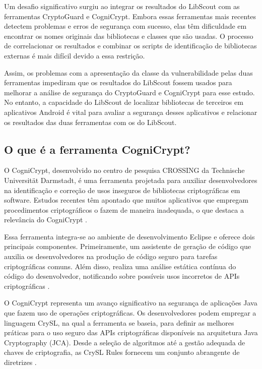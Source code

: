 Um desafio significativo surgiu ao integrar os resultados do LibScout com as ferramentas CryptoGuard e CogniCrypt. Embora essas ferramentas mais recentes detectem problemas e erros de segurança com sucesso, elas têm dificuldade em encontrar os nomes originais das bibliotecas e classes que são usadas. O processo de correlacionar os resultados e combinar os scripts de identificação de bibliotecas externas é mais difícil devido a essa restrição.

Assim, os problemas com a apresentação da classe da vulnerabilidade pelas duas ferramentas impediram que os resultados do LibScout fossem usados para melhorar a análise de segurança do CryptoGuard e CogniCrypt para esse estudo. No entanto, a capacidade do LibScout de localizar bibliotecas de terceiros em aplicativos Android é vital para avaliar a segurança desses aplicativos e relacionar os resultados das duas ferramentas com os do LibScout.

\subsection{O que é a ferramenta CogniCrypt?} %

O CogniCrypt, desenvolvido no centro de pesquisa CROSSING da Technische Universität Darmstadt, é uma ferramenta projetada para auxiliar desenvolvedores na identificação e correção de usos inseguros de bibliotecas criptográficas em software. Estudos recentes têm apontado que muitos aplicativos que empregam procedimentos criptográficos o fazem de maneira inadequada, o que destaca a relevância do CogniCrypt \cite{CogniCrypt}.

Essa ferramenta integra-se ao ambiente de desenvolvimento Eclipse e oferece dois principais componentes. Primeiramente, um assistente de geração de código que auxilia os desenvolvedores na produção de código seguro para tarefas criptográficas comuns. Além disso, realiza uma análise estática contínua do código do desenvolvedor, notificando sobre possíveis usos incorretos de APIs criptográficas \cite{CogniCrypt}.

O CogniCrypt representa um avanço significativo na segurança de aplicações Java que fazem uso de operações criptográficas. Os desenvolvedores podem empregar a linguagem CrySL, na qual a ferramenta se baseia, para definir as melhores práticas para o uso seguro das APIs criptográficas disponíveis na arquitetura Java Cryptography (JCA). Desde a seleção de algoritmos até a gestão adequada de chaves de criptografia, as CrySL Rules fornecem um conjunto abrangente de diretrizes \cite{CogniCrypt}.

